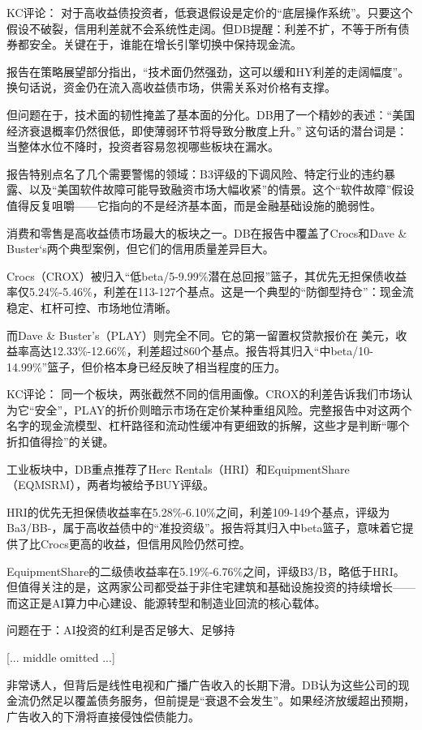 \documentclass[11pt]{ctexart}
\begin{document}
KC评论： 对于高收益债投资者，低衰退假设是定价的“底层操作系统”。只要这个假设不破裂，信用利差就不会系统性走阔。但DB提醒：利差不扩，不等于所有债券都安全。关键在于，谁能在增长引擎切换中保持现金流。

报告在策略展望部分指出，“技术面仍然强劲，这可以缓和HY利差的走阔幅度”。换句话说，资金仍在流入高收益债市场，供需关系对价格有支撑。

但问题在于，技术面的韧性掩盖了基本面的分化。DB用了一个精妙的表述：“美国经济衰退概率仍然很低，即使薄弱环节将导致分散度上升。” 这句话的潜台词是：当整体水位不降时，投资者容易忽视哪些板块在漏水。

报告特别点名了几个需要警惕的领域：B3评级的下调风险、特定行业的违约暴露、以及“美国软件故障可能导致融资市场大幅收紧”的情景。这个“软件故障”假设值得反复咀嚼——它指向的不是经济基本面，而是金融基础设施的脆弱性。

消费和零售是高收益债市场最大的板块之一。DB在报告中覆盖了Crocs和Dave \& Buster‘s两个典型案例，但它们的信用质量差异巨大。

Crocs（CROX）被归入“低beta/5-9.99\%潜在总回报”篮子，其优先无担保债收益率仅5.24\%-5.46\%，利差在113-127个基点。这是一个典型的“防御型持仓”：现金流稳定、杠杆可控、市场地位清晰。

而Dave \& Buster’s（PLAY）则完全不同。它的第一留置权贷款报价在 美元，收益率高达12.33\%-12.66\%，利差超过860个基点。报告将其归入“中beta/10-14.99\%”篮子，但价格本身已经反映了相当程度的压力。

KC评论： 同一个板块，两张截然不同的信用画像。CROX的利差告诉我们市场认为它“安全”，PLAY的折价则暗示市场在定价某种重组风险。完整报告中对这两个名字的现金流模型、杠杆路径和流动性缓冲有更细致的拆解，这些才是判断“哪个折扣值得捡”的关键。

工业板块中，DB重点推荐了Herc Rentals（HRI）和EquipmentShare（EQMSRM），两者均被给予BUY评级。

HRI的优先无担保债收益率在5.28\%-6.10\%之间，利差109-149个基点，评级为Ba3/BB-，属于高收益债中的“准投资级”。报告将其归入中beta篮子，意味着它提供了比Crocs更高的收益，但信用风险仍然可控。

EquipmentShare的二级债收益率在5.19\%-6.76\%之间，评级B3/B，略低于HRI。但值得关注的是，这两家公司都受益于非住宅建筑和基础设施投资的持续增长——而这正是AI算力中心建设、能源转型和制造业回流的核心载体。

问题在于：AI投资的红利是否足够大、足够持

[... middle omitted ...]

非常诱人，但背后是线性电视和广播广告收入的长期下滑。DB认为这些公司的现金流仍然足以覆盖债务服务，但前提是“衰退不会发生”。如果经济放缓超出预期，广告收入的下滑将直接侵蚀偿债能力。
\end{document}
